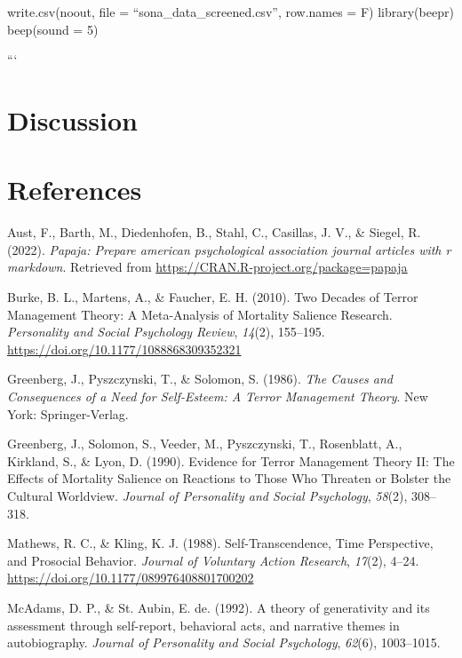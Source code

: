 \documentclass[
  man]{apa6}
\newlength{\cslhangindent}
\newenvironment{CSLReferences}[2] %
 {\begin{list}{}{%
  \setlength{\itemindent}{0pt}
  \setlength{\leftmargin}{0pt}
  \setlength{\parsep}{0pt}
  \ifodd #1
   \setlength{\leftmargin}{\cslhangindent}
   \setlength{\itemindent}{-1\cslhangindent}
  \fi
  \setlength{\itemsep}{#2\baselineskip}}}
 {\end{list}}
\begin{document}
write.csv(noout, file = ``sona\_data\_screened.csv'', row.names = F)
library(beepr) beep(sound = 5)

```

\section{Discussion}\label{discussion}

\newpage

\section{References}\label{references}

\label{refs}
\begin{CSLReferences}{1}{0}
Aust, F., Barth, M., Diedenhofen, B., Stahl, C., Casillas, J. V., \& Siegel, R. (2022). \emph{Papaja: Prepare american psychological association journal articles with r markdown}. Retrieved from \url{https://CRAN.R-project.org/package=papaja}

Burke, B. L., Martens, A., \& Faucher, E. H. (2010). Two Decades of Terror Management Theory: A Meta-Analysis of Mortality Salience Research. \emph{Personality and Social Psychology Review}, \emph{14}(2), 155--195. \url{https://doi.org/10.1177/1088868309352321}

Greenberg, J., Pyszczynski, T., \& Solomon, S. (1986). \emph{The Causes and Consequences of a Need for Self-Esteem: A Terror Management Theory}. New York: Springer-Verlag.

Greenberg, J., Solomon, S., Veeder, M., Pyszczynski, T., Rosenblatt, A., Kirkland, S., \& Lyon, D. (1990). Evidence for Terror Management Theory II: The Effects of Mortality Salience on Reactions to Those Who Threaten or Bolster the Cultural Worldview. \emph{Journal of Personality and Social Psychology}, \emph{58}(2), 308--318.

Mathews, R. C., \& Kling, K. J. (1988). Self-Transcendence, Time Perspective, and Prosocial Behavior. \emph{Journal of Voluntary Action Research}, \emph{17}(2), 4--24. \url{https://doi.org/10.1177/089976408801700202}

McAdams, D. P., \& St. Aubin, E. de. (1992). A theory of generativity and its assessment through self-report, behavioral acts, and narrative themes in autobiography. \emph{Journal of Personality and Social Psychology}, \emph{62}(6), 1003--1015.

\end{CSLReferences}
\end{document}
